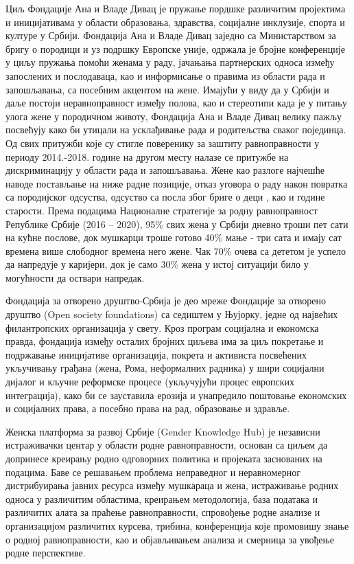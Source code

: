 \documentclass[a4paper]{article}
\begin{document}
Циљ Фондације Ана и Владе Дивац је пружање пордшке различитим пројектима и иницијативама у области образовања, здравства, социјалне инклузије, спорта и културе у Србији. Фондација Ана и Владе Дивац  заједно са Министарством за бригу о породици и уз подршку  Европске уније,  одржала је бројне  конференције у циљу пружања помоћи женама у раду, јачањања партнерских односа између запослених и послодаваца, као и информисање о правима из области рада и запошљавања, са посебним акцентом на жене.  Имајући у виду да у Србији и даље постоји неравноправност између полова, као и стереотипи када је у питању улога жене у породичном животу, Фондација Ана и Владе Дивац велику пажљу посвећују како би утицали на усклађивање рада и родитељства сваког појединца. Од свих притужби које су стигле поверенику за заштиту равноправности у периоду 2014.-2018. године на другом месту налазе се притужбе на дискриминацију у области рада  и запошљавања. Жене као разлоге најчешће наводе постављање на ниже радне позиције, отказ уговора о раду након  повратка са породијског одсуства, одсуство са посла због бриге о деци , као и године старости. Према подацима Националне стратегије за родну равноправност Републике Србије (2016 – 2020), 95\% свих жена у Србији дневно троши пет сати на кућне послове, док мушкарци троше готово 40\% мање - три сата и имају сат времена више слободног времена него жене. Чак 70\% очева са дететом је успело да напредује у каријери, док је само 30\%  жена у истој ситуацији било у могућности да оствари напредак.\cite{fondacijaAna}

Фондација за отворено друштво-Србија је део мреже Фондације за отворено друштво (Open society foundations) са седиштем у Њујорку, једне од највећих филантропских организација у свету. Кроз програм социјална и економска правда, фондација између осталих бројних циљева има за циљ покретање и подржавање иницијативе организација, покрета и активиста посвећених укључивању грађана  (жена, Рома, неформалних радника) у шири социјални дијалог и кључне реформске процесе (укључујући процес европских интеграција), како би се зауставила ерозија и унапредило поштовање економских и социјалних права, а посебно права на рад, образовање и здравље. 
    \cite{fondacijaVrata}
    
Женска платформа за развој Србије (Gender Knowledge Hub)  је  независни истраживачки центар у области родне равноправности, основан  са циљем да допринесе креирању родно одговорних политика и пројеката заснованих на подацима. Баве се решавањем  проблема неправедног и неравномерног дистрибуирања јавних ресурса између мушкараца и жена, истраживање родних односа у различитим областима, креирањем методологија, база података и различитих алата за праћење равноправности, спровођење  родне анализе и организацијом различитих курсева, трибина, конференција које промовишу знање о родној равноправности, као и објављивањем анализа и смерница за увођење родне перспективе. \cite{fondacijaZene}
\end{document}
